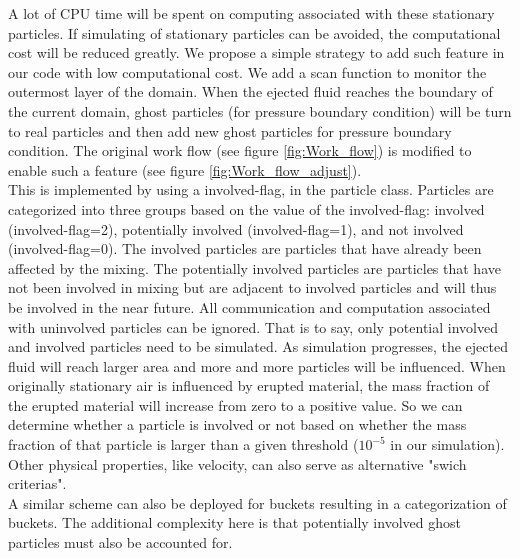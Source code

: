 \documentclass[conference,compsoc]{IEEEtran}
\begin{document}
A lot of CPU time will be spent on computing associated with these stationary particles.  If simulating of stationary particles can be avoided, the computational cost will be reduced greatly. %
We propose a simple strategy to add such feature in our code with low computational cost. We add a scan function to monitor the outermost layer of the domain. When the ejected fluid reaches the boundary of the current domain, ghost particles (for pressure boundary condition) will be turn to real particles and then add new ghost particles for pressure boundary condition. The original work flow (see figure \ref{fig:Work_flow}) is modified to enable such a feature (see figure \ref{fig:Work_flow_adjust}).\\
This is implemented by using a involved-flag, in the particle class. Particles are categorized into three groups based on the value of the involved-flag: involved (involved-flag=2), potentially involved (involved-flag=1), and not involved (involved-flag=0). The involved particles are particles that have already been affected by the mixing. The potentially involved particles are particles that have not been involved in mixing but are adjacent to involved particles and will thus be involved in the near future. %
All communication and computation associated with uninvolved particles can be ignored. That is to say, only potential involved and involved particles need to be simulated.
As simulation progresses, the ejected fluid will reach larger area and more and more particles will be influenced. When originally stationary air is influenced by erupted material, the mass fraction of the erupted material will increase from zero to a positive value. So we can determine whether a particle is involved or not based on whether the mass fraction of that particle is larger than a given threshold ($10^{-5} $ in our simulation). Other physical properties, like velocity, can also serve as alternative "swich criterias".\\
A similar scheme can also be deployed for buckets resulting in a categorization  of buckets. The additional complexity here is that potentially involved ghost particles must also be accounted for.
\end{document}
